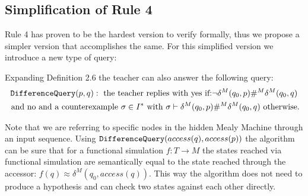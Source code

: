 \subsection{Simplification of Rule 4}
Rule 4 has proven to be the hardest version to verify formally, thus we propose a simpler version that accomplishes the same. For this simplified version we introduce a new type of query: 
\begin{definition}
	Expanding Definition 2.6 the teacher can also answer the following query:
	\begin{gather*}
		\textnormal{\texttt{DifferenceQuery}}(p,q): \text{ the teacher replies with yes if:} \neg\delta^M(q_0,p)\#^M\delta^M(q_0,q)\\ \text{ and no and a counterexample } \sigma\in I^* \text{ with } \sigma\vdash\delta^M(q_0,p)\#^M\delta^M(q_0,q) \text{ otherwise.}
	\end{gather*}
\end{definition}
Note that we are referring to specific nodes in the hidden Mealy Machine through an input sequence. Using $\textnormal{\texttt{DifferenceQuery}} (access(q),access(p))$ the algorithm can be sure that for a functional simulation $f:T\rightarrow M$ the states reached via functional simulation are semantically equal to the state reached through the accessor: $f(q)\approx \delta^M(q_0,access(q))$. This way the algorithm does not need to produce a hypothesis and can check two states against each other directly. \\
